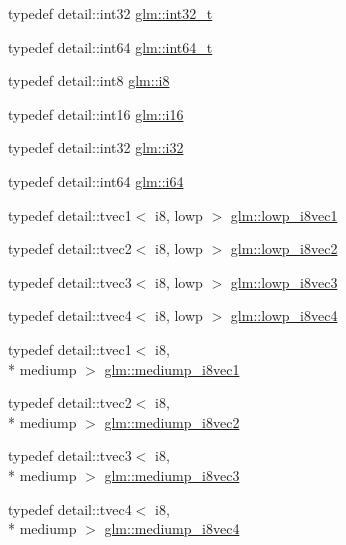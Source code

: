 \begin{DoxyCompactItemize}
\item 
typedef detail\-::int32 \hyperlink{group__gtc__type__precision_gab870c0eb6f525b0c8c4716762e0fc3a8}{glm\-::int32\-\_\-t}
\item 
typedef detail\-::int64 \hyperlink{group__gtc__type__precision_ga6abb23fbf4e39c50ec5341160b5da5ab}{glm\-::int64\-\_\-t}
\item 
typedef detail\-::int8 \hyperlink{group__gtc__type__precision_gaae064be68b7d36cd7910c16e8ad18bba}{glm\-::i8}
\item 
typedef detail\-::int16 \hyperlink{group__gtc__type__precision_ga35e5542ca05b29cc256fdafb8503d1fd}{glm\-::i16}
\item 
typedef detail\-::int32 \hyperlink{group__gtc__type__precision_ga1d8ed5c43e91ea7d4528389da4fa9524}{glm\-::i32}
\item 
typedef detail\-::int64 \hyperlink{group__gtc__type__precision_gac7a7eaad46064fc952b06df33689da23}{glm\-::i64}
\item 
typedef detail\-::tvec1$<$ i8, lowp $>$ \hyperlink{group__gtc__type__precision_ga490ff77964d0386c1db936eb2a324988}{glm\-::lowp\-\_\-i8vec1}
\item 
typedef detail\-::tvec2$<$ i8, lowp $>$ \hyperlink{group__gtc__type__precision_ga511280c8869c7c79bba3c359f37f5559}{glm\-::lowp\-\_\-i8vec2}
\item 
typedef detail\-::tvec3$<$ i8, lowp $>$ \hyperlink{group__gtc__type__precision_ga048811f03c327d4b56564a72d98800e8}{glm\-::lowp\-\_\-i8vec3}
\item 
typedef detail\-::tvec4$<$ i8, lowp $>$ \hyperlink{group__gtc__type__precision_ga095202095a1fefbdae4a974c3b750223}{glm\-::lowp\-\_\-i8vec4}
\item 
typedef detail\-::tvec1$<$ i8, \\*
mediump $>$ \hyperlink{group__gtc__type__precision_ga820f8b497e06d518968d00761747c547}{glm\-::mediump\-\_\-i8vec1}
\item 
typedef detail\-::tvec2$<$ i8, \\*
mediump $>$ \hyperlink{group__gtc__type__precision_ga38eba1ab306fe5cc5eeafa35ce5b5b26}{glm\-::mediump\-\_\-i8vec2}
\item 
typedef detail\-::tvec3$<$ i8, \\*
mediump $>$ \hyperlink{group__gtc__type__precision_ga91b40a693c1db26a7cc544339b326df3}{glm\-::mediump\-\_\-i8vec3}
\item 
typedef detail\-::tvec4$<$ i8, \\*
mediump $>$ \hyperlink{group__gtc__type__precision_gad41bf4bfa504dc1191623ff77151d01f}{glm\-::mediump\-\_\-i8vec4}

\end{DoxyCompactItemize}
